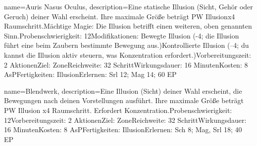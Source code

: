 {
    name={Auris Nasus Oculus},
    description={Eine statische Illusion (Sicht, Gehör oder Geruch) deiner Wahl erscheint. Ihre maximale Größe beträgt PW Illusionx4 Raumschritt.\newline Mächtige Magie: Die Illusion betrifft einen weiteren, oben genannten Sinn.\newline Probenschwierigkeit: 12\newline Modifikationen: Bewegte Illusion (-4; die Illusion führt eine beim Zaubern bestimmte Bewegung aus.)\newline Kontrollierte Illusion (–4; du kannst die Illusion aktiv steuern, was Konzentration erfordert.)\newline Vorbereitungszeit: 2 Aktionen\newline Ziel: Zone\newline Reichweite: 32 Schritt\newline Wirkungsdauer: 16 Minuten\newline Kosten: 8 AsP\newline Fertigkeiten: Illusion\newline Erlernen: Srl 12; Mag 14; 60 EP}
}


{
    name={Blendwerk},
    description={Eine Illusion (Sicht) deiner Wahl erscheint, die Bewegungen nach deinen Vorstellungen ausführt. Ihre maximale Größe beträgt PW Illusion x4 Raumschritt. Erfordert Konzentration.\newline Probenschwierigkeit: 12\newline Vorbereitungszeit: 2 Aktionen\newline Ziel: Zone\newline Reichweite: 32 Schritt\newline Wirkungsdauer: 16 Minuten\newline Kosten: 8 AsP\newline Fertigkeiten: Illusion\newline Erlernen: Sch 8; Mag, Srl 18; 40 EP}
}


